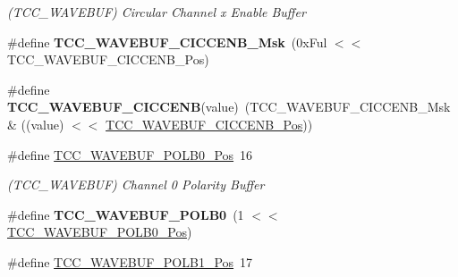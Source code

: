 \begin{DoxyCompactItemize}
\begin{DoxyCompactList}\small\item\em (T\+C\+C\+\_\+\+W\+A\+V\+E\+B\+U\+F) Circular Channel x Enable Buffer \end{DoxyCompactList}\item 
\hypertarget{group___s_a_m_l21___t_c_c_gadf6620d83765dfd642ca9cabf1649f1c}{}\#define {\bfseries T\+C\+C\+\_\+\+W\+A\+V\+E\+B\+U\+F\+\_\+\+C\+I\+C\+C\+E\+N\+B\+\_\+\+Msk}~(0x\+Ful $<$$<$ T\+C\+C\+\_\+\+W\+A\+V\+E\+B\+U\+F\+\_\+\+C\+I\+C\+C\+E\+N\+B\+\_\+\+Pos)\label{group___s_a_m_l21___t_c_c_gadf6620d83765dfd642ca9cabf1649f1c}

\item 
\hypertarget{group___s_a_m_l21___t_c_c_gabc40bb9e66539fa6d592b9731ad239b2}{}\#define {\bfseries T\+C\+C\+\_\+\+W\+A\+V\+E\+B\+U\+F\+\_\+\+C\+I\+C\+C\+E\+N\+B}(value)~(T\+C\+C\+\_\+\+W\+A\+V\+E\+B\+U\+F\+\_\+\+C\+I\+C\+C\+E\+N\+B\+\_\+\+Msk \& ((value) $<$$<$ \hyperlink{group___s_a_m_l21___t_c_c_gaf4f390457af0268b79c515d96f29ddad}{T\+C\+C\+\_\+\+W\+A\+V\+E\+B\+U\+F\+\_\+\+C\+I\+C\+C\+E\+N\+B\+\_\+\+Pos}))\label{group___s_a_m_l21___t_c_c_gabc40bb9e66539fa6d592b9731ad239b2}

\item 
\hypertarget{group___s_a_m_l21___t_c_c_gac2abd24444c5f98d8382923ffdbb9461}{}\#define \hyperlink{group___s_a_m_l21___t_c_c_gac2abd24444c5f98d8382923ffdbb9461}{T\+C\+C\+\_\+\+W\+A\+V\+E\+B\+U\+F\+\_\+\+P\+O\+L\+B0\+\_\+\+Pos}~16\label{group___s_a_m_l21___t_c_c_gac2abd24444c5f98d8382923ffdbb9461}

\begin{DoxyCompactList}\small\item\em (T\+C\+C\+\_\+\+W\+A\+V\+E\+B\+U\+F) Channel 0 Polarity Buffer \end{DoxyCompactList}\item 
\hypertarget{group___s_a_m_l21___t_c_c_gac3c5bfe532647cda8851ee8ad9b627ca}{}\#define {\bfseries T\+C\+C\+\_\+\+W\+A\+V\+E\+B\+U\+F\+\_\+\+P\+O\+L\+B0}~(1 $<$$<$ \hyperlink{group___s_a_m_l21___t_c_c_gac2abd24444c5f98d8382923ffdbb9461}{T\+C\+C\+\_\+\+W\+A\+V\+E\+B\+U\+F\+\_\+\+P\+O\+L\+B0\+\_\+\+Pos})\label{group___s_a_m_l21___t_c_c_gac3c5bfe532647cda8851ee8ad9b627ca}

\item 
\hypertarget{group___s_a_m_l21___t_c_c_ga8918d7edd38d5562f90d3a96c385434d}{}\#define \hyperlink{group___s_a_m_l21___t_c_c_ga8918d7edd38d5562f90d3a96c385434d}{T\+C\+C\+\_\+\+W\+A\+V\+E\+B\+U\+F\+\_\+\+P\+O\+L\+B1\+\_\+\+Pos}~17\label{group___s_a_m_l21___t_c_c_ga8918d7edd38d5562f90d3a96c385434d}


\end{DoxyCompactItemize}
